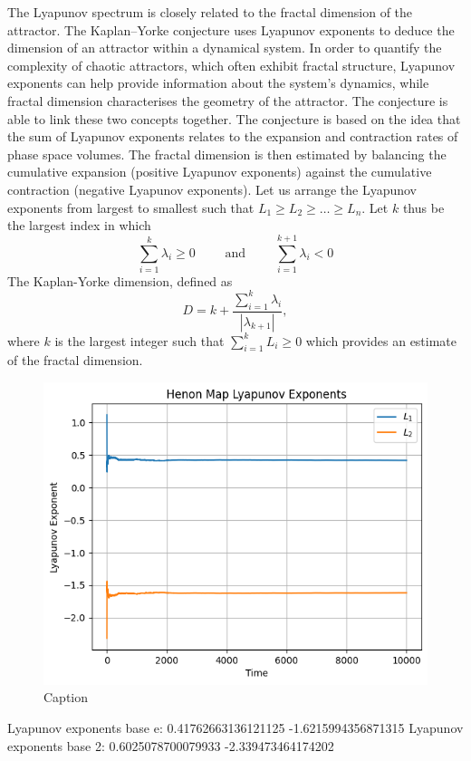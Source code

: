 The Lyapunov spectrum is closely related to the fractal dimension of the attractor. The Kaplan–Yorke conjecture uses Lyapunov exponents to deduce the dimension of an attractor within a dynamical system. In order to quantify the complexity of chaotic attractors, which often exhibit fractal structure, Lyapunov exponents can help provide information about the system's dynamics, while fractal dimension characterises the geometry of the attractor. The conjecture is able to link these two concepts together. The conjecture is based on the idea that the sum of Lyapunov exponents relates to the expansion and contraction rates of phase space volumes. The fractal dimension is then estimated by balancing the cumulative expansion (positive Lyapunov exponents) against the cumulative contraction (negative Lyapunov exponents). Let us arrange the Lyapunov exponents from largest to smallest such that $L_1 \geq L_2 \geq \dots \geq L_n$. Let $k$ thus be the largest index in which
$$
\sum_{i=1}^k \lambda_i\geq 0 \quad\quad \text{ and } \quad \quad \sum_{i=1}^{k+1} \lambda_i <0
$$
The Kaplan-Yorke dimension, defined as
$$
D = k + \frac{\sum_{i=1}^k \lambda_i}{|\lambda_{k+1}|},
$$
where $k$ is the largest integer such that $\sum_{i=1}^k L_i \geq 0$ which provides an estimate of the fractal dimension.

\begin{exmp}
    \begin{figure}
        \centering
        \includegraphics[width=0.95\linewidth]{Bifurcation Images/lyapunov_henon.png}
        \caption{Caption}
        \label{fig:lyapunov_henon}
    \end{figure}
    Lyapunov exponents base e: 0.41762663136121125 -1.6215994356871315
    Lyapunov exponents base 2: 0.6025078700079933 -2.339473464174202
\end{exmp}

